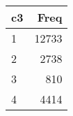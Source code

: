 
\begin{tabular}[t]{lr}
\toprule
c3 & Freq\\
\midrule
1 & 12733\\
2 & 2738\\
3 & 810\\
4 & 4414\\
\bottomrule
\end{tabular}